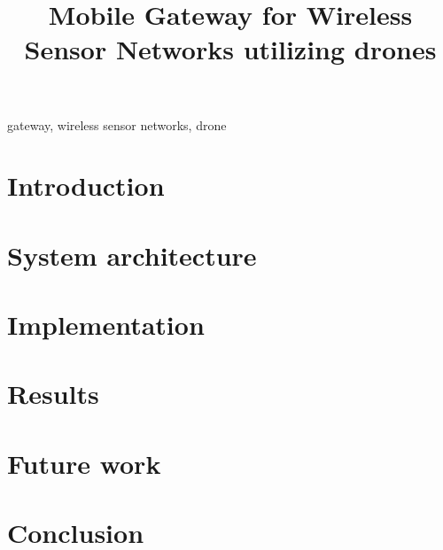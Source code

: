 \documentclass[conference]{IEEEtran}
\begin{document}
\title{Mobile Gateway for Wireless Sensor Networks utilizing drones}



\author{
  }

\maketitle

\begin{abstract} 

\end{abstract}

\begin{IEEEkeywords}
gateway, wireless sensor networks, drone
\end{IEEEkeywords}

\section{Introduction}
\label{sec:introduction}


\section{System architecture}
\label{sec:architecture}


\section{Implementation}
\label{sec:implementation}



\section{Results} 
\label{sec:results}


\section{Future work} 
\label{sec:future}


\section{Conclusion}
\label{sec:conclusion}






\end{document}
